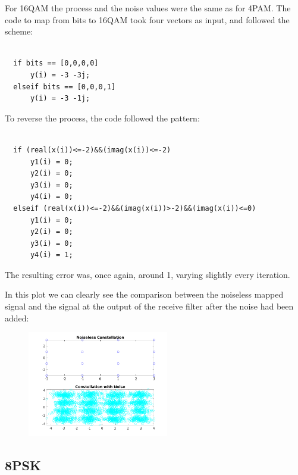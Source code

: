 \documentclass[a4paper,11pt]{article}
\begin{document}
For 16QAM the process and the noise values were the same as for 4PAM. The code
to map from bits to 16QAM took four vectors as input, and followed the scheme:

\bigskip
\begin{lstlisting}

  if bits == [0,0,0,0]
      y(i) = -3 -3j;
  elseif bits == [0,0,0,1]
      y(i) = -3 -1j;

\end{lstlisting}
\bigskip

To reverse the process, the code followed the pattern:

\bigskip
\begin{lstlisting}

  if (real(x(i))<=-2)&&(imag(x(i))<=-2)
      y1(i) = 0;
      y2(i) = 0;
      y3(i) = 0;
      y4(i) = 0;
  elseif (real(x(i))<=-2)&&(imag(x(i))>-2)&&(imag(x(i))<=0)
      y1(i) = 0;
      y2(i) = 0;
      y3(i) = 0;
      y4(i) = 1;

\end{lstlisting}
\bigskip

The resulting error was, once again, around 1, varying slightly every iteration.

In this plot we can clearly see the comparison between the noiseless mapped
signal and the signal at the output of the receive filter after the noise had
been added:

\begin{figure}[!hp]
    \begin{center}
      \includegraphics[width=0.55\textwidth]{images/16QAM1.png}
    \end{center}
\end{figure}

\newpage

\subsection{8PSK}
\end{document}
